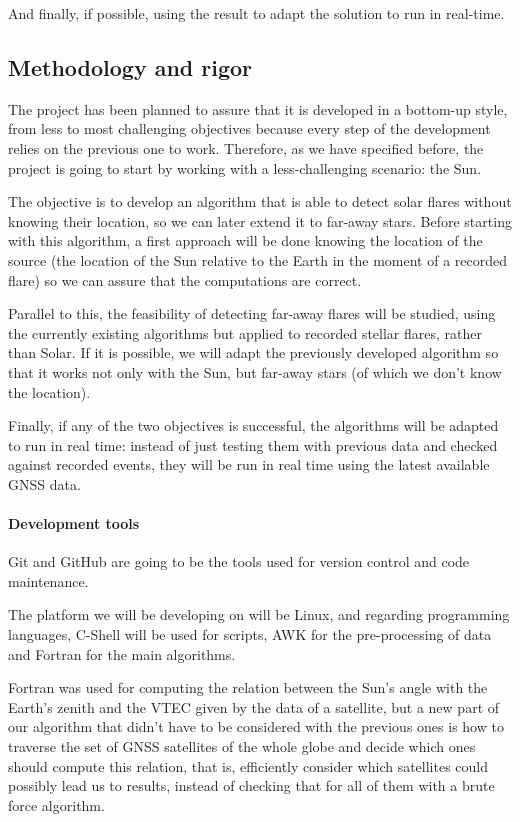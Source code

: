 And finally, if possible, using the result to adapt the solution to run in real-time.

\subsection{Methodology and rigor}

The project has been planned to assure that it is developed in a bottom-up style, from less to most challenging objectives because every step of the development relies on the previous one to work. Therefore, as we have specified before, the project is going to start by working with a less-challenging scenario: the Sun.

The objective is to develop an algorithm that is able to detect solar flares without knowing their location, so we can later extend it to far-away stars. Before starting with this algorithm, a first approach will be done knowing the location of the source (the location of the Sun relative to the Earth in the moment of a recorded flare) so we can assure that the computations are correct.

Parallel to this, the feasibility of detecting far-away flares will be studied, using the currently existing algorithms \cite{hernandez2012gnss} but applied to recorded stellar flares, rather than Solar. If it is possible, we will adapt the previously developed algorithm so that it works not only with the Sun, but far-away stars (of which we don't know the location).

Finally, if any of the two objectives is successful, the algorithms will be adapted to run in real time: instead of just testing them with previous data and checked against recorded events, they will be run in real time using the latest available GNSS data.

\paragraph{Development tools}

Git and GitHub are going to be the tools used for version control and code maintenance.

The platform we will be developing on will be Linux, and regarding programming languages, C-Shell will be used for scripts, AWK for the pre-processing of data and Fortran for the main algorithms. 

Fortran was used for computing the relation between the Sun’s angle with the Earth’s zenith and the VTEC given by the data of a satellite, but a new part of our algorithm that didn’t have to be considered with the previous ones is how to traverse the set of GNSS satellites of the whole globe and decide which ones should compute this relation, that is, efficiently consider which satellites could possibly lead us to results, instead of checking that for all of them with a brute force algorithm.

